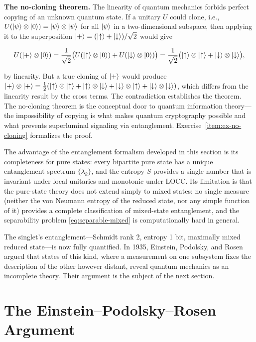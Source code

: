 \medskip\noindent\textbf{The no-cloning theorem.}
The linearity of quantum mechanics forbids perfect copying of an unknown quantum state. If a unitary $U$ could clone, i.e., $U(\ket{\psi} \otimes \ket{0}) = \ket{\psi} \otimes \ket{\psi}$ for all $\ket{\psi}$ in a two-dimensional subspace, then applying it to the superposition $\ket{+} = (\ket{\uparrow} + \ket{\downarrow})/\sqrt{2}$ would give
\begin{linenomath}
\begin{equation}
U(\ket{+}\otimes\ket{0})
= \frac{1}{\sqrt{2}}\bigl(U(\ket{\uparrow}\otimes\ket{0}) + U(\ket{\downarrow}\otimes\ket{0})\bigr)
= \frac{1}{\sqrt{2}}\bigl(\ket{\uparrow}\otimes\ket{\uparrow} + \ket{\downarrow}\otimes\ket{\downarrow}\bigr),
\end{equation}
\end{linenomath}
by linearity. But a true cloning of $\ket{+}$ would produce $\ket{+}\otimes\ket{+} = \frac12(\ket{\uparrow}\otimes\ket{\uparrow} + \ket{\uparrow}\otimes\ket{\downarrow} + \ket{\downarrow}\otimes\ket{\uparrow} + \ket{\downarrow}\otimes\ket{\downarrow})$, which differs from the linearity result by the cross terms. The contradiction establishes the theorem. The no-cloning theorem is the conceptual door to quantum information theory---the impossibility of copying is what makes quantum cryptography possible and what prevents superluminal signaling via entanglement. Exercise~\ref{item:ex-no-cloning} formalizes the proof.

The advantage of the entanglement formalism developed in this section is its completeness for pure states: every bipartite pure state has a unique entanglement spectrum $\{\lambda_k\}$, and the entropy $S$ provides a single number that is invariant under local unitaries and monotonic under LOCC. Its limitation is that the pure-state theory does not extend simply to mixed states: no single measure (neither the von Neumann entropy of the reduced state, nor any simple function of it) provides a complete classification of mixed-state entanglement, and the separability problem \eqref{eq:separable-mixed} is computationally hard in general.

The singlet's entanglement---Schmidt rank 2, entropy 1 bit, maximally mixed reduced state---is now fully quantified. In 1935, Einstein, Podolsky, and Rosen argued that states of this kind, where a measurement on one subsystem fixes the description of the other however distant, reveal quantum mechanics as an incomplete theory. Their argument is the subject of the next section.
\section{The Einstein--Podolsky--Rosen Argument}
\label{sec:epr}

